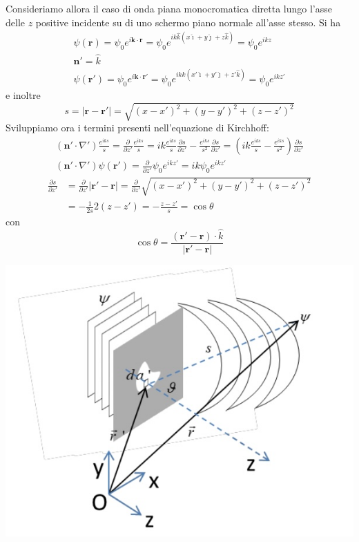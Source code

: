 Consideriamo allora il caso di onda piana monocromatica diretta lungo
l'asse delle \(z\) positive incidente su di uno schermo piano normale
all'asse stesso.
Si ha
\begin{gather*}
	\psi(\bm{r}) = \psi_0 e^{i \bm{k} \cdot \bm{r}}= \psi_0 e^{ik \hat{k}(x \hat{\imath}+y \hat{\jmath}+z \hat{k})}
	= \psi_{0} e^{ikz}\\
	\bm{n}' = \hat{k}\\
	\psi(\bm{r'}) = \psi_0 e^{i \bm{k} \cdot \bm{r'}}= \psi_0 e^{ik \hat{k}(x' \hat{\imath}+y' \hat{\jmath}+z' \hat{k})}
	= \psi_{0} e^{ikz'}
\end{gather*}
e inoltre
\[
	s = |\bm{r} - \bm{r}'| = \sqrt{(x-x')^2+(y-y')^2+(z-z')^2}
\]
Sviluppiamo ora i termini presenti nell'equazione di Kirchhoff:
\begin{gather*}
	(\bm{n}' \cdot \nabla')\frac{e^{iks}}{s} = \frac{\partial}{\partial z'}\frac{e^{iks}}{s} = ik \frac{e^{iks}}{s}\frac{\partial s}{\partial z'} - \frac{e^{iks}}{s^2}\frac{\partial s}{\partial z'}  = \left( ik \frac{e^{iks}}{s}- \frac{e^{iks}}{s^2} \right)\frac{\partial s}{\partial z'}\\
	(\bm{n}' \cdot \nabla')\psi(\bm{r'}) = \frac{\partial}{\partial z'}\psi_0e^{ikz'}=ik\psi_0 e^{ikz'}
\end{gather*}
\begin{align*}
	\frac{\partial s}{\partial z'} & = \frac{\partial }{\partial z'}|\bm{r'}-\bm{r}|
	= \frac{\partial }{\partial z'}\sqrt{(x-x')^2+(y-y')^2+(z-z')^2} \\
	                               & = - \frac{1}{2s}2(z-z') = - \frac{z-z'}{s} = \cos \theta
\end{align*}
con
\[
\cos \theta = \frac{ (\bm{r'}-\bm{r})\cdot \hat{k}}{|\bm{r'}-\bm{r}|}
\]
\begin{marginfigure}
	\includegraphics[width = 1.25 \textwidth, height = 1.25 \textheight]{figs/kirchhoff-diffraction-2}
	\label{fig:kirchhoff2}
\end{marginfigure}
